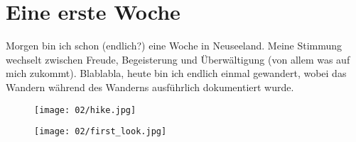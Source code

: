 \chapter{Eine erste Woche}

Morgen bin ich schon (endlich?) eine Woche in Neuseeland. Meine
Stimmung wechselt zwischen Freude, Begeisterung und Überwältigung (von
allem was auf mich zukommt). Blablabla, heute bin ich endlich einmal
gewandert, wobei das Wandern während des Wanderns ausführlich
dokumentiert wurde.
\begin{figure}[h]
  \centering
  \texttt{[image: 02/hike.jpg]}
\end{figure}

\begin{figure}[h]
  \centering
  \texttt{[image: 02/first\_look.jpg]}
\end{figure}
